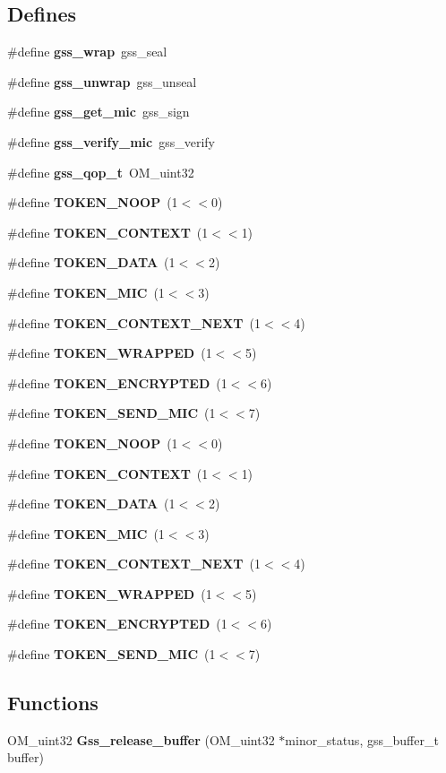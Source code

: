 \subsection*{Defines}
\begin{CompactItemize}
\item 
\#define {\bf gss\_\-wrap}\ gss\_\-seal
\item 
\#define {\bf gss\_\-unwrap}\ gss\_\-unseal
\item 
\#define {\bf gss\_\-get\_\-mic}\ gss\_\-sign
\item 
\#define {\bf gss\_\-verify\_\-mic}\ gss\_\-verify
\item 
\#define {\bf gss\_\-qop\_\-t}\ OM\_\-uint32
\item 
\#define {\bf TOKEN\_\-NOOP}\ (1$<$$<$0)
\item 
\#define {\bf TOKEN\_\-CONTEXT}\ (1$<$$<$1)
\item 
\#define {\bf TOKEN\_\-DATA}\ (1$<$$<$2)
\item 
\#define {\bf TOKEN\_\-MIC}\ (1$<$$<$3)
\item 
\#define {\bf TOKEN\_\-CONTEXT\_\-NEXT}\ (1$<$$<$4)
\item 
\#define {\bf TOKEN\_\-WRAPPED}\ (1$<$$<$5)
\item 
\#define {\bf TOKEN\_\-ENCRYPTED}\ (1$<$$<$6)
\item 
\#define {\bf TOKEN\_\-SEND\_\-MIC}\ (1$<$$<$7)
\item 
\#define {\bf TOKEN\_\-NOOP}\ (1$<$$<$0)
\item 
\#define {\bf TOKEN\_\-CONTEXT}\ (1$<$$<$1)
\item 
\#define {\bf TOKEN\_\-DATA}\ (1$<$$<$2)
\item 
\#define {\bf TOKEN\_\-MIC}\ (1$<$$<$3)
\item 
\#define {\bf TOKEN\_\-CONTEXT\_\-NEXT}\ (1$<$$<$4)
\item 
\#define {\bf TOKEN\_\-WRAPPED}\ (1$<$$<$5)
\item 
\#define {\bf TOKEN\_\-ENCRYPTED}\ (1$<$$<$6)
\item 
\#define {\bf TOKEN\_\-SEND\_\-MIC}\ (1$<$$<$7)
\end{CompactItemize}
\subsection*{Functions}
\begin{CompactItemize}
\item 
OM\_\-uint32 {\bf Gss\_\-release\_\-buffer} (OM\_\-uint32 $\ast$minor\_\-status, gss\_\-buffer\_\-t buffer)
\end{CompactItemize}
